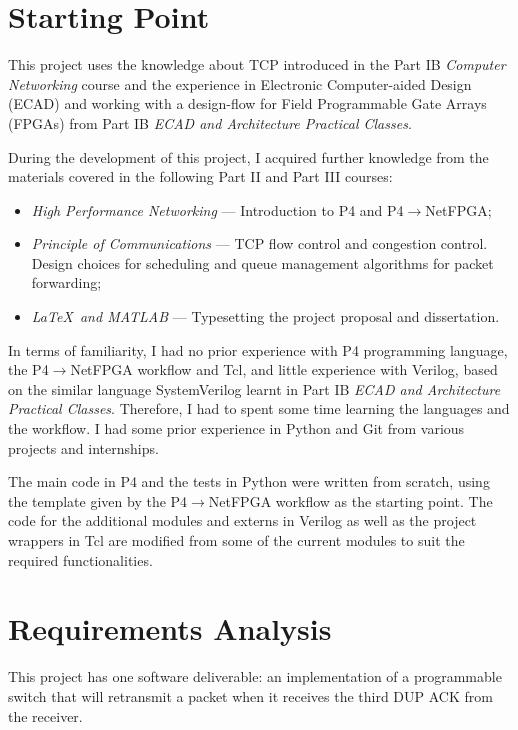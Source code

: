 \section{Starting Point}
	This project uses the knowledge about TCP introduced in the Part IB \textit{Computer Networking} course and the experience in Electronic Computer-aided Design (ECAD) and working with a design-flow for Field Programmable Gate Arrays (FPGAs) from Part IB \textit{ECAD and Architecture Practical Classes}.
	
	During the development of this project, I acquired further knowledge from the materials covered in the following Part II and Part III courses:%
	
	\begin{itemize}
		\item \textit{High Performance Networking} --- Introduction to P4 and P4$\rightarrow$NetFPGA;%
		\item \textit{Principle of Communications} --- TCP flow control and congestion control. Design choices for scheduling and queue management algorithms for packet forwarding;%
		\item \textit{\LaTeX \ and MATLAB} --- Typesetting the project proposal and dissertation.%
	\end{itemize}
	
	In terms of familiarity, I had no prior experience with P4 programming language, the P4$\rightarrow$NetFPGA workflow and Tcl, and little experience with Verilog, based on the similar language SystemVerilog learnt in Part IB \textit{ECAD and Architecture Practical Classes}. Therefore, I had to spent some time learning the languages and the workflow. I had some prior experience in Python and Git from various projects and internships.
	
	The main code in P4 and the tests in Python were written from scratch, using the template given by the P4$\rightarrow$NetFPGA workflow as the starting point. The code for the additional modules and externs in Verilog as well as the project wrappers in Tcl are modified from some of the current modules to suit the required functionalities.
	
\section{Requirements Analysis}
This project has one software deliverable: an implementation of a programmable switch that will retransmit a packet when it receives the third DUP ACK from the receiver.


